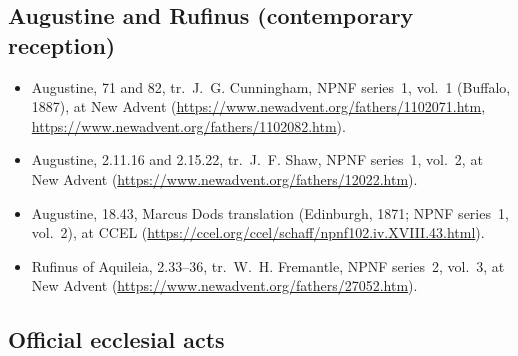\subsection*{Augustine and Rufinus (contemporary reception)}

\begin{itemize}
\item Augustine,  71 and 82, tr.\ J.~G. Cunningham, NPNF
series~1, vol.~1 (Buffalo, 1887), at New Advent
(\url{https://www.newadvent.org/fathers/1102071.htm},
\url{https://www.newadvent.org/fathers/1102082.htm}).
\item Augustine,  2.11.16 and 2.15.22, tr.\
J.~F. Shaw, NPNF series~1, vol.~2, at New Advent
(\url{https://www.newadvent.org/fathers/12022.htm}).
\item Augustine,  18.43, Marcus Dods translation
(Edinburgh, 1871; NPNF series~1, vol.~2), at CCEL
(\url{https://ccel.org/ccel/schaff/npnf102.iv.XVIII.43.html}).
\item Rufinus of Aquileia,  2.33--36, tr.\
W.~H. Fremantle, NPNF series~2, vol.~3, at New Advent
(\url{https://www.newadvent.org/fathers/27052.htm}).
\end{itemize}

\subsection*{Official ecclesial acts}

